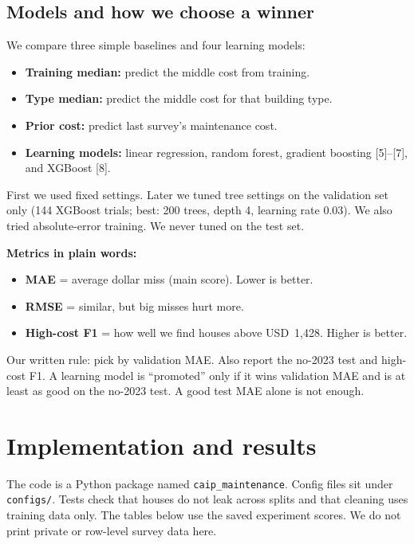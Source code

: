 \documentclass[11pt,a4paper]{article}
\begin{document}
\subsection{Models and how we choose a winner}

We compare three simple baselines and four learning models:

\begin{itemize}
  \item \textbf{Training median:} predict the middle cost from training.
  \item \textbf{Type median:} predict the middle cost for that building type.
  \item \textbf{Prior cost:} predict last survey's maintenance cost.
  \item \textbf{Learning models:} linear regression, random forest, gradient boosting [5]--[7], and XGBoost [8].
\end{itemize}

First we used fixed settings. Later we tuned tree settings on the validation set only (144 XGBoost trials; best: 200 trees, depth 4, learning rate 0.03). We also tried absolute-error training. We never tuned on the test set.

\textbf{Metrics in plain words:}
\begin{itemize}
  \item \textbf{MAE} = average dollar miss (main score). Lower is better.
  \item \textbf{RMSE} = similar, but big misses hurt more.
  \item \textbf{High-cost F1} = how well we find houses above USD~1{,}428. Higher is better.
\end{itemize}

Our written rule: pick by validation MAE. Also report the no-2023 test and high-cost F1. A learning model is ``promoted'' only if it wins validation MAE and is at least as good on the no-2023 test. A good test MAE alone is not enough.

\section{Implementation and results}

The code is a Python package named \texttt{caip\_maintenance}. Config files sit under \texttt{configs/}. Tests check that houses do not leak across splits and that cleaning uses training data only. The tables below use the saved experiment scores. We do not print private or row-level survey data here.
\end{document}

